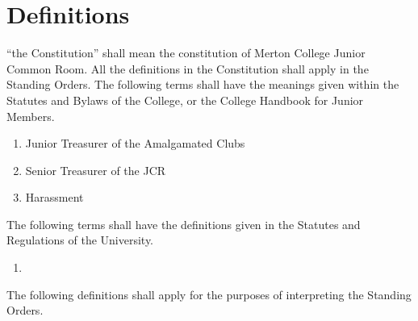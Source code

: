 \chapter{Definitions} \label{App:Defs}


\appnpara ``the Constitution'' shall mean the constitution of Merton College Junior Common Room.
\appnpara All the definitions in the Constitution shall apply in the Standing Orders.
\appnpara The following terms shall have the meanings given within the Statutes and Bylaws of the College, or the College Handbook for Junior Members.
\begin{enumerate}
\item Junior Treasurer of the Amalgamated Clubs
\item Senior Treasurer of the JCR
\item Harassment
\end{enumerate}
\appnpara The following terms shall have the definitions given in the Statutes and Regulations of the University.
\begin{enumerate}
\item
\end{enumerate}
\appnpara The following definitions shall apply for the purposes of interpreting the Standing Orders.


